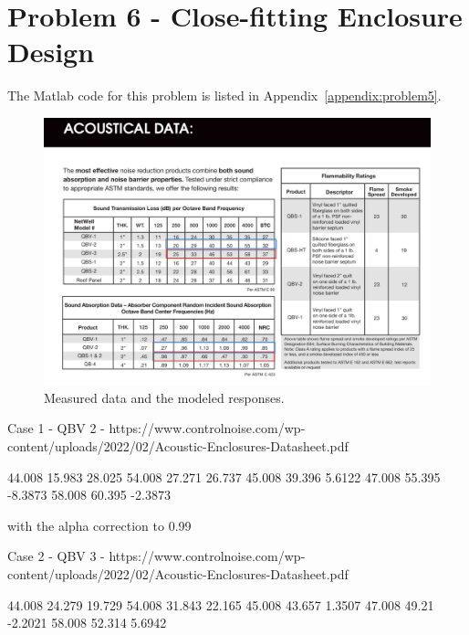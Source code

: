 {\newpage
\section*{Problem 6 - Close-fitting Enclosure Design}

The Matlab code for this problem is listed in Appendix~\ref{appendix:problem5}.

\vspace{0.25cm}
%


\begin{figure}[htbp]
    \center
    \includegraphics[scale=0.5]{Q5 NW Data.png}
    \vspace{-0.5cm}
    \caption{Measured data and the modeled responses.}
    \label{figure:q5nwData}
\end{figure}


Case 1 - QBV 2 - https://www.controlnoise.com/wp-content/uploads/2022/02/Acoustic-Enclosures-Datasheet.pdf

       44.008       15.983       28.025
       54.008       27.271       26.737
       45.008       39.396       5.6122
       47.008       55.395      -8.3873
       58.008       60.395      -2.3873
       
with the alpha correction to 0.99


Case 2 - QBV 3 - https://www.controlnoise.com/wp-content/uploads/2022/02/Acoustic-Enclosures-Datasheet.pdf

       44.008       24.279       19.729
       54.008       31.843       22.165
       45.008       43.657       1.3507
       47.008        49.21      -2.2021
       58.008       52.314       5.6942
       
}
